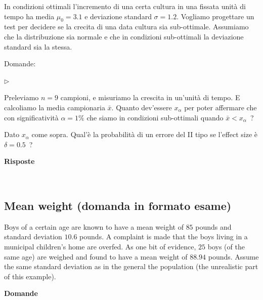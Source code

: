 \documentclass[11pt,openany]{book}
\newcommand{\mylabel}[1]{{\footnotesize\textsf{#1}}\hfill}
\renewenvironment{itemize}
  {\begin{list}{$\triangleright$}{%
   \setlength{\parskip}{0mm}
   \setlength{\topsep}{.2\baselineskip}
   \setlength{\rightmargin}{0mm}
   \setlength{\listparindent}{0mm}
   \setlength{\itemindent}{0mm}
   \setlength{\labelwidth}{3ex}
   \setlength{\itemsep}{.4\baselineskip}
   \setlength{\parsep}{0mm}
   \setlength{\partopsep}{0mm}
   \setlength{\labelsep}{1ex}
   \setlength{\leftmargin}{\labelwidth+\labelsep}
   \let\makelabel\mylabel}}{%
   \end{list}\vspace*{-1.3mm}}
\begin{document}
In condizioni ottimali l'incremento di una certa cultura in una fissata unità di tempo ha media $\mu_0=3.1$ e deviazione standard $\sigma=1.2$.
Vogliamo progettare un test per decidere se la crecita di una data cultura sia sub-ottimale. Assumiamo che la distribuzione sia normale e che in condizioni sub-ottimali la deviazione standard sia la stessa. 

Domande:

\begin{itemize}
\item[1] Preleviamo $n=9$ campioni, e misuriamo la crescita in un'unità di tempo. E calcoliamo la media campionaria $\bar x$. Quanto dev'essere $x_\alpha$ per poter affermare che con significatività $\alpha=1\%$ che siamo in condizioni sub-ottimali quando $\bar x<x_\alpha$~?
\item[2] Dato $x_\alpha$ come sopra. Qual'è la probabilità di un errore del II tipo se l'effect size è $\delta=0.5$~?
\end{itemize}

\textbf{Risposte}





\clearpage\
\subsection{Mean weight (domanda in formato esame)}

Boys of a certain age are known to have a mean weight of $85$ pounds and standard deviation $10.6$ pounds. A complaint is made that the boys living in a municipal children's home are overfed. As one bit of evidence, $25$ boys (of the same age) are weighed and found to have a mean weight of $88.94$ pounds. Assume the same standard deviation as in the general the population (the unrealistic part of this example).


\textbf{Domande}
\end{document}
